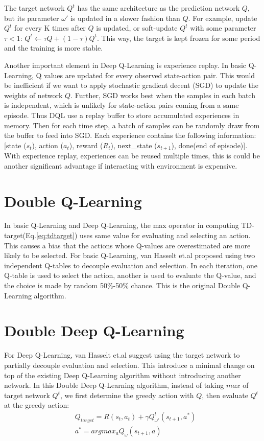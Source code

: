 \documentclass[conference]{IEEEtran}
\begin{document}
The target network $Q^t$ has the same architecture as the prediction network $Q$, but its parameter $\omega'$ is updated in a slower fashion than $Q$. For example, update $Q^t$ for every K times after $Q$ is updated, or soft-update $Q^t$ with some parameter $\tau<1$:
$Q^t \leftarrow \tau Q + (1-\tau) Q^t$. This way, the target is kept frozen for some period and the training is more stable.

Another important element in Deep Q-Learning is experience replay\cite{lin1992self,smnih2015human}. In basic Q-Learning, Q values are updated for every observed state-action pair. This would be inefficient if we want to apply stochastic gradient decent (SGD) to update the weights of network $Q$. Further, SGD works best when the samples in each batch is independent, which is unlikely for state-action pairs coming from a same episode. Thus DQL use a replay buffer to store accumulated experiences in memory. Then for each time step, a batch of samples can be randomly draw from the buffer to feed into SGD. Each experience contains the following information: [state ($s_t$), action ($a_t$), reward ($R_t$), next\_state ($s_{t+1}$), done(end of episode)]. With experience replay, experiences can be reused multiple times, this is could be another significant advantage if interacting with environment is expensive.

\section{Double Q-Learning}
In basic Q-Learning and Deep Q-Learning, the max operator in computing TD-target(Eq.\ref{eq:tdtarget})  uses same value for evaluating and selecting an action. This causes a bias that the actions whose Q-values are overestimated are more likely to be selected. For basic Q-Learning, van Hasselt et.al proposed using two independent Q-tables to decouple evaluation and selection\cite{hasselt2010double}. In each iteration, one Q-table is used to select the action, another is used to evaluate the Q-value, and the choice is made by random 50\%-50\% chance. This is the original Double Q-Learning algorithm.

\section{Double Deep Q-Learning}
For Deep Q-Learning, van Hasselt et.al suggest using the target network to partially decouple evaluation and selection. This introduce a minimal change on top of the existing Deep Q-Learning algorithm without introducing another network. In this Double Deep Q-Learning algorithm\cite{HasseltGS15DDQL}, instead of taking $max$ of target network $Q^t$, we first determine the greedy action with $Q$, then evaluate $Q^t$ at the greedy action:
\begin{align}
& Q_{target} = R(s_t, a_t) + \gamma Q^t_{\omega'}(s_{t+1}, a^*) \\
& a^* = argmax_a Q_\omega(s_{t+1}, a)
\end{align}
\end{document}
